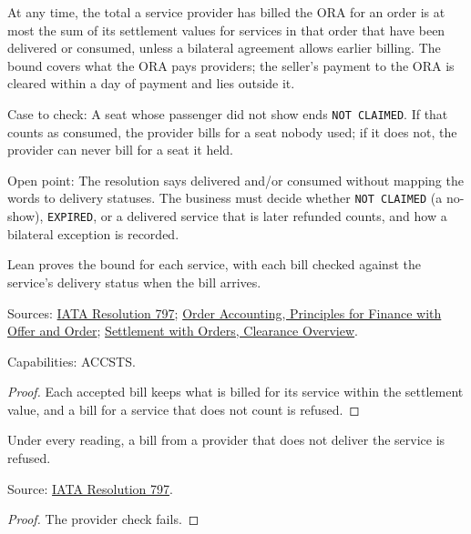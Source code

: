 \begin{theorem}
  \label{thm:accounting-billed-within-delivered}
  At any time, the total a service provider has billed the ORA for an order
  is at most the sum of its settlement values for services in that order
  that have been delivered or consumed, unless a bilateral agreement allows
  earlier billing. The bound covers what the ORA pays providers; the
  seller's payment to the ORA is cleared within a day of payment and lies
  outside it.

  Case to check: A seat whose passenger did not show ends \texttt{NOT
  CLAIMED}. If that counts as consumed, the provider bills for a seat nobody
  used; if it does not, the provider can never bill for a seat it held.

  Open point: The resolution says delivered and/or consumed without mapping
  the words to delivery statuses. The business must decide whether
  \texttt{NOT CLAIMED} (a no-show), \texttt{EXPIRED}, or a delivered service
  that is later refunded counts, and how a bilateral exception is recorded.

  Lean proves the bound for each service, with each bill checked against
  the service's delivery status when the bill arrives.

  Sources: \href{https://www.iata.org/contentassets/72cbd60393ff42b5975d90ce9e049a7d/oneorder-resolution-797.pdf}{IATA Resolution 797};
  \href{https://standards.atlassian.net/wiki/spaces/OA/pages/617185366}{Order Accounting, Principles for Finance with Offer and Order};
  \href{https://standards.atlassian.net/wiki/spaces/SWO/pages/574653069}{Settlement with Orders, Clearance Overview}.

  Capabilities: ACCSTS.
\end{theorem}
\begin{proof}
  Each accepted bill keeps what is billed for its service within the
  settlement value, and a bill for a service that does not count is refused.
\end{proof}

\begin{theorem}
  \label{thm:accounting-bill-other-provider}
  Under every reading, a bill from a provider that does not deliver the
  service is refused.

  Source: \href{https://www.iata.org/contentassets/72cbd60393ff42b5975d90ce9e049a7d/oneorder-resolution-797.pdf}{IATA Resolution 797}.
\end{theorem}
\begin{proof}
  The provider check fails.
\end{proof}


